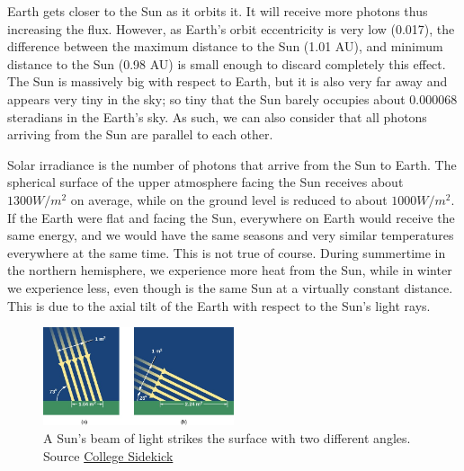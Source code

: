 Earth gets closer to the Sun as it orbits it. It will receive more photons thus increasing the flux. However, as Earth's orbit eccentricity is very low (0.017), the difference between the maximum distance to the Sun (1.01 AU), and minimum distance to the Sun (0.98 AU) is small enough to discard completely this effect. The Sun is massively big with respect to Earth, but it is also very far away and appears very tiny in the sky; so tiny that the Sun barely occupies about 0.000068 steradians in the Earth's sky. As such, we can also consider that all photons arriving from the Sun are parallel to each other.

Solar irradiance is the number of photons that arrive from the Sun to Earth. The spherical surface of the upper atmosphere facing the Sun receives about $1300 W/m^2$ on average, while on the ground level is reduced to about $1000W/m^2$. If the Earth were flat and facing the Sun, everywhere on Earth would receive the same energy, and we would have the same seasons and very similar temperatures everywhere at the same time. This is not true of course. During summertime in the northern hemisphere, we experience more heat from the Sun, while in winter we experience less, even though is the same Sun at a virtually constant distance. This is due to the axial tilt of the Earth with respect to the Sun's light rays. \vspace{1mm}

\begin{figure}[H]

    \centering
    \includegraphics[width=0.5\textwidth]{figures/Vitamin D/OSC_Astro_04_02_Sunray2.jpg}
    \caption{A Sun's beam of light strikes the surface with two different angles. Source \href{https://www.collegesidekick.com/study-guides/astronomy/the-seasons}{College Sidekick}}
    \label{fig:rayTilt}

\end{figure}


